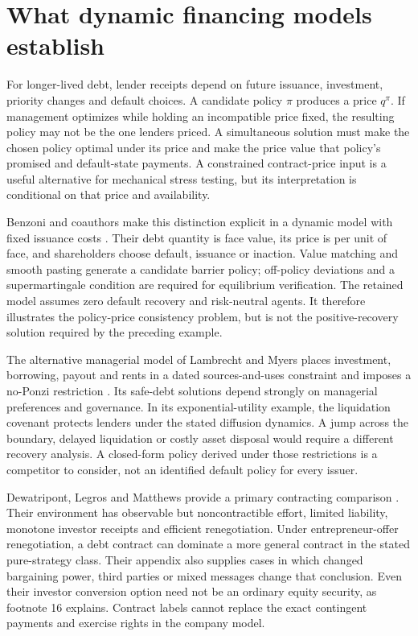 
\section{What dynamic financing models establish}
For longer-lived debt, lender receipts depend on future issuance, investment,
priority changes and default choices. A candidate policy $\pi$ produces a
price $q^\pi$. If management optimizes while holding an incompatible price
fixed, the resulting policy may not be the one lenders priced. A simultaneous
solution must make the chosen policy optimal under its price and make the
price value that policy's promised and default-state payments. A constrained
contract-price input is a useful alternative for mechanical stress testing,
but its interpretation is conditional on that price and availability.

Benzoni and coauthors make this distinction explicit in a dynamic model with
fixed issuance costs \cite[Section~2, Propositions~1--2, Appendix~A]{litclosebenzoni}.
Their debt quantity is face value, its price is per unit of face, and
shareholders choose default, issuance or inaction. Value matching and smooth
pasting generate a candidate barrier policy; off-policy deviations and a
supermartingale condition are required for equilibrium verification. The
retained model assumes zero default recovery and risk-neutral agents. It
therefore illustrates the policy-price consistency problem, but is not the
positive-recovery solution required by the preceding example.

The alternative managerial model of Lambrecht and Myers places investment,
borrowing, payout and rents in a dated sources-and-uses constraint and imposes
a no-Ponzi restriction \cite[Sections~2--4]{litcloselambrecht}. Its safe-debt
solutions depend strongly on managerial preferences and governance. In its
exponential-utility example, the liquidation covenant protects lenders under
the stated diffusion dynamics. A jump across the boundary, delayed liquidation
or costly asset disposal would require a different recovery analysis. A
closed-form policy derived under those restrictions is a competitor to
consider, not an identified default policy for every issuer.

Dewatripont, Legros and Matthews provide a primary contracting comparison
\cite[Sections~2--6 and Appendix~B]{litclosedewat}. Their environment has observable
but noncontractible effort, limited liability, monotone investor receipts and
efficient renegotiation. Under entrepreneur-offer renegotiation, a debt
contract can dominate a more general contract in the stated pure-strategy
class. Their appendix also supplies cases in which changed bargaining power,
third parties or mixed messages change that conclusion. Even their investor
conversion option need not be an ordinary equity security, as footnote 16
explains. Contract labels cannot replace the exact contingent payments and
exercise rights in the company model.
